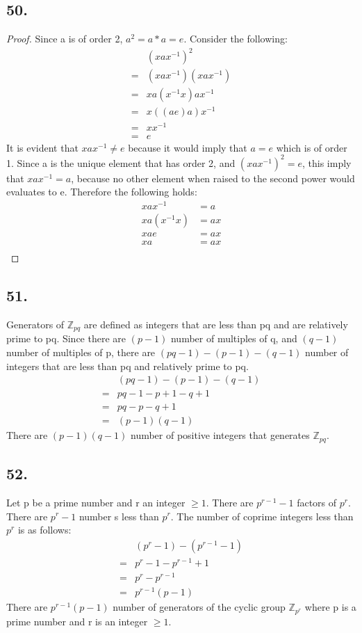 \documentclass{article}
\begin{document}
\subsection*{50. }
\begin{proof} Since a is of order 2, $a^2 = a*a = e$. Consider the following: 
\begin{align*}
	&(xax^{-1})^2\\
	=& (xax^{-1})(xax^{-1})\\
	=& xa(x^{-1}x)ax^{-1}\\
	=& x((ae)a)x^{-1}\\
	=& xx^{-1}\\
	=& e
\end{align*}
It is evident that $xax^{-1} \neq e$ because it would imply that $a=e$ which is
of order 1. Since a is the unique element that has order 2, and
$(xax^{-1})^2=e$, this imply that $xax^{-1}=a$, because no other element when
raised to the second power would evaluates to e. Therefore the following holds:
\begin{align*}
	xax^{-1}&=a\\
	xa(x^{-1}x)&=ax\\
	xae&=ax\\
	xa&=ax\\
\end{align*}
\end{proof} 

\subsection*{51. }
Generators of $\mathbb{Z}_{pq}$ are defined as integers that are less than pq
and are relatively prime to pq. Since there are $(p-1)$ number of multiples of
q, and $(q-1)$ number of multiples of p, there are $(pq-1) - (p-1) - (q-1)$
number of integers that are less than pq and relatively prime to pq.
	\begin{align*}
		&(pq-1) - (p-1) - (q-1)\\
		=& pq-1 - p+1 - q+1\\
		=& pq - p - q+1 \\
		=& (p-1)(q-1)
	\end{align*}
	There are $(p-1)(q-1)$ number of positive integers that generates
	$\mathbb{Z}_{pq}$.

\subsection*{52. }
Let p be a prime number and r an integer $\ge 1$. There are $p^{r-1}-1$ factors
of $p^r$. There are $p^r - 1$ number s less than $p^r$. The number of coprime
integers less than $p^r$ is as follows: 
	\begin{align*}
		&(p^r-1) - (p^{r-1} - 1)\\
		=& p^r-1 - p^{r-1} + 1\\
		=& p^r - p^{r-1}\\
		=& p^{r-1}(p-1)
	\end{align*}
	There are $p^{r-1}(p-1)$ number of generators of the cyclic group
	$\mathbb{Z}_{p^r}$ where p is a prime number and r is an integer $\ge 1$.
\end{document}
